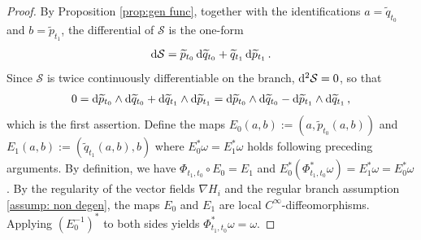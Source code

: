 \documentclass[11pt, oneside]{article}
\numberwithin{equation}{section}
\theoremstyle{definition}
\newcommand{\wt}[1]{\widetilde{#1}}
\newcommand{\mc}[1]{\mathcal{#1}}
\newcommand{\mcal}[1]{\mc{#1}}
\def\rmd{{\rm d}}
\begin{document}
\begin{proof}
    By Proposition \ref{prop:gen func}, together with the identifications $a = \wt{q}_{t_0}$ and $b = \wt{p}_{t_1}$, the differential of $\mcal{S}$ is the one-form
    \begin{align*}
        \rmd \mcal{S} = \wt{p}_{t_0}\,\rmd \wt{q}_{t_0} + \wt{q}_{t_1}\,\rmd \wt{p}_{t_1}\,.
    \end{align*}
    Since $\mcal{S}$ is twice continuously differentiable on the branch, $\rmd^2 \mcal{S} = 0$, so that
    \begin{align*}
        0 = \rmd \wt{p}_{t_0}\wedge \rmd \wt{q}_{t_0} + \rmd \wt{q}_{t_1}\wedge \rmd \wt{p}_{t_1} = \rmd \wt{p}_{t_0}\wedge \rmd \wt{q}_{t_0} - \rmd \wt{p}_{t_1}\wedge \rmd \wt{q}_{t_1}\,,
    \end{align*}
    which is the first assertion. Define the maps $E_0(a,b) := \left(a, \wt{p}_{t_0}(a,b)\right)$ and $E_1(a,b) := \left(\wt{q}_{t_1}(a,b), b\right)$ where $E_0^*\omega = E_1^*\omega$ holds following preceding arguments. By definition, we have $\Phi_{t_1,t_0}\circ E_0 = E_1$ and $E_0^*\left(\Phi^*_{t_1,t_0}\omega\right) = E_1^*\omega = E_0^*\omega$. By the regularity of the vector fields $\nabla H_i$ and the regular branch assumption \ref{assump: non degen}, the maps $E_0$ and $E_1$ are local $C^\infty$-diffeomorphisms. Applying $(E^{-1}_0)^*$ to both sides yields $\Phi^*_{t_1,t_0}\omega = \omega$.
\end{proof}
\end{document}
